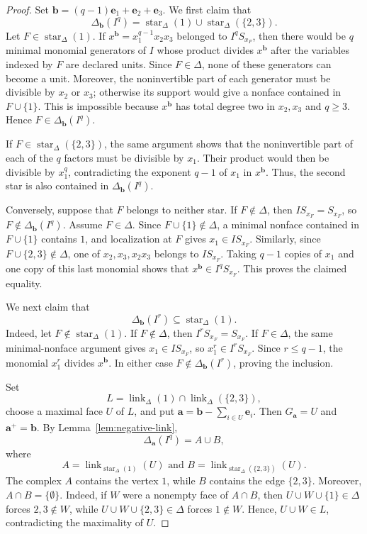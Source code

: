 \documentclass[10pt,a4paper]{amsart}
\begin{document}
\begin{proof}
Set $\mathbf b=(q-1)\mathbf e_1+\mathbf e_2+\mathbf e_3$. We first claim
that
$$
\Delta_{\mathbf b}(I^q)
=
\operatorname{star}_\Delta(1)
\cup
\operatorname{star}_\Delta(\{2,3\}).
$$
Let $F\in\operatorname{star}_\Delta(1)$. If
$x^{\mathbf b}=x_1^{q-1}x_2x_3$ belonged to $I^qS_{x_F}$, then there would
be $q$ minimal monomial generators of $I$ whose product divides
$x^{\mathbf b}$ after the variables indexed by $F$ are declared units.
Since $F\in\Delta$, none of these generators can become a unit. Moreover,
the noninvertible part of each generator must be divisible by $x_2$ or $x_3$;
otherwise its support would give a nonface contained in $F\cup\{1\}$. This is impossible because
$x^{\mathbf b}$ has total degree two in $x_2,x_3$ and $q\ge3$. Hence
$F\in\Delta_{\mathbf b}(I^q)$.

If $F\in\operatorname{star}_\Delta(\{2,3\})$, the same argument shows
that the noninvertible part of each of the $q$ factors must be divisible by
$x_1$. Their product would then be divisible by $x_1^q$, contradicting the
exponent $q-1$ of $x_1$ in $x^{\mathbf b}$. Thus, the second star is also
contained in $\Delta_{\mathbf b}(I^q)$.

Conversely, suppose that $F$ belongs to neither star. If $F\notin\Delta$,
then $IS_{x_F}=S_{x_F}$, so $F\notin\Delta_{\mathbf b}(I^q)$. Assume
$F\in\Delta$. Since $F\cup\{1\}\notin\Delta$, a minimal nonface
contained in $F\cup\{1\}$ contains $1$, and localization at $F$ gives
$x_1\in IS_{x_F}$. Similarly, since
$F\cup\{2,3\}\notin\Delta$, one of $x_2,x_3,x_2x_3$ belongs to
$IS_{x_F}$. Taking $q-1$ copies of $x_1$ and one copy of this last monomial
shows that $x^{\mathbf b}\in I^qS_{x_F}$. This proves the claimed equality.

We next claim that
$$
\Delta_{\mathbf b}(I^r)\subseteq\operatorname{star}_\Delta(1).
$$
Indeed, let $F\notin\operatorname{star}_\Delta(1)$. If
$F\notin\Delta$, then $I^rS_{x_F}=S_{x_F}$. If $F\in\Delta$, the same
minimal-nonface argument gives $x_1\in IS_{x_F}$, so
$x_1^r\in I^rS_{x_F}$. Since $r\le q-1$, the monomial $x_1^r$ divides
$x^{\mathbf b}$. In either case $F\notin\Delta_{\mathbf b}(I^r)$,
proving the inclusion.

Set
$$
L=\operatorname{link}_\Delta(1)
\cap
\operatorname{link}_\Delta(\{2,3\}),
$$
choose a maximal face $U$ of $L$, and put
$\mathbf a=\mathbf b-\sum_{i\in U}\mathbf e_i$. Then
$G_{\mathbf a}=U$ and $\mathbf a^+=\mathbf b$. By
Lemma~\ref{lem:negative-link},
$$
\Delta_{\mathbf a}(I^q)=A\cup B,
$$
where
$$
A=\operatorname{link}_{\operatorname{star}_\Delta(1)}(U)
\text{ and }
B=\operatorname{link}_{\operatorname{star}_\Delta(\{2,3\})}(U).
$$
The complex $A$ contains the vertex $1$, while $B$ contains the edge
$\{2,3\}$. Moreover, $A\cap B=\{\emptyset\}$. Indeed, if $W$ were a
nonempty face of $A\cap B$, then
$U\cup W\cup\{1\}\in\Delta$ forces $2,3\notin W$, while
$U\cup W\cup\{2,3\}\in\Delta$ forces $1\notin W$. Hence,
$U\cup W\in L$, contradicting the maximality of $U$.


\end{proof}
\end{document}
